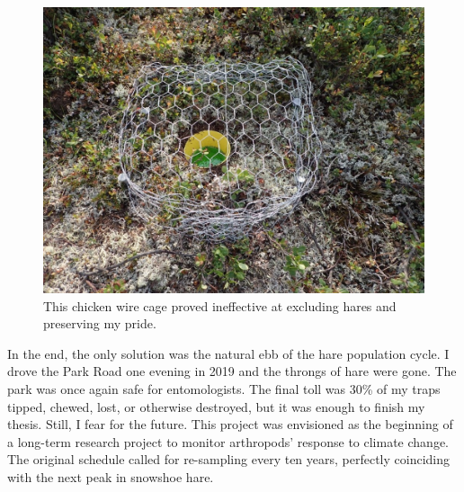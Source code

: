 \begin{figure}[H]
\begin{center}
\vspace{2mm}
\includegraphics[width=\textwidth]{img/hare_cage.jpg}
\caption{This chicken wire cage proved ineffective at excluding hares and preserving my pride.}
\label{hare_cage}
\end{center}
\end{figure} 

In the end, the only solution was the natural ebb of the hare population cycle. I drove the Park Road one evening in 2019 and the throngs of hare were gone. The park was once again safe for entomologists. The final toll was 30\% of my traps tipped, chewed, lost, or otherwise destroyed, but it was enough to finish my thesis. Still, I fear for the future. This project was envisioned as the beginning of a long-term research project to monitor arthropods’ response to climate change. The original schedule called for re-sampling every ten years, perfectly coinciding with the next peak in snowshoe hare.

%

